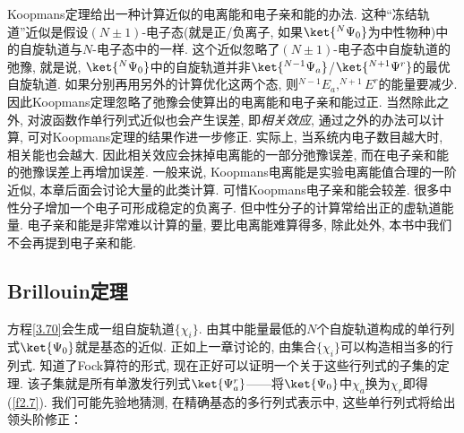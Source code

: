 Koopmans定理给出一种计算近似的电离能和电子亲和能的办法. 这种“冻结轨道”近似是假设$(N\pm1)$-电子态(就是正/负离子, 如果$\ket{^N\Psi_0}$为中性物种)中的自旋轨道与$N$-电子态中的一样. 
这个近似忽略了$(N\pm1)$-电子态中自旋轨道的弛豫, 就是说, $\ket{^N\Psi_0}$中的自旋轨道并非$\ket{^{N-1}\Psi_a}$/$\ket{^{N+1}\Psi^r}$的最优自旋轨道. 
如果分别再用另外的\hft 计算优化这两个态, 则$^{N-1}E_a,^{N+1}E^r$的能量要减少. 因此Koopmans定理忽略了弛豫会使算出的电离能和电子亲和能过正. 
当然除此之外, 对波函数作单行列式近似也会产生误差, 即\emph{相关效应}, 通过\hft 之外的办法可以计算, 可对Koopmans定理的结果作进一步修正. 
实际上, 当系统内电子数目越大时, 相关能也会越大. 
因此相关效应会抹掉电离能的一部分弛豫误差, 而在电子亲和能的弛豫误差上再增加误差. 
一般来说, Koopmans电离能是实验电离能值合理的一阶近似, 本章后面会讨论大量的此类计算. 
可惜Koopmans电子亲和能会较差. 很多中性分子增加一个电子可形成稳定的负离子. 
但中性分子的\hft 计算常给出正的虚轨道能量. 
电子亲和能是非常难以计算的量, 要比电离能难算得多, 除此处外, 本书中我们不会再提到电子亲和能.

\subsection{Brillouin定理}
\label{sec3.3.2}
\hft 方程\autoref{3.70}会生成一组自旋轨道$\{\chi_i\}$. 
由其中能量最低的$N$个自旋轨道构成的单行列式$\ket{\Psi_0}$就是基态的\hft 近似. 
正如上一章讨论的, 由集合$\{\chi_i\}$可以构造相当多的行列式. 
知道了Fock算符的形式, 现在正好可以证明一个关于这些行列式的子集的定理. 
该子集就是所有单激发行列式$\ket{\Psi_a^r}$——将$\ket{\Psi_0}$中$\chi_a$换为$\chi_r$即得(\autoref{f2.7}). 
我们可能先验地猜测, 在精确基态的多行列式表示中, 这些单行列式将给出领头阶修正：

